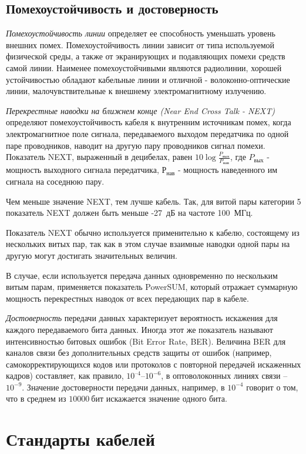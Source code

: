 \subsection{Помехоустойчивость и достоверность}

\emph{Помехоустойчивость линии} определяет ее способность уменьшать уровень внешних помех.
Помехоустойчивость линии зависит от типа используемой физической среды, а также от экранирующих и подавляющих помехи средств самой линии.
Наименее помехоустойчивыми являются радиолинии, хорошей устойчивостью обладают кабельные линии и отличной - волоконно-оптические линии, малочувствительные к внешнему электромагнитному излучению.

\emph{Перекрестные наводки на ближнем конце (Near End Cross Talk - NEXT)} определяют помехоустойчивость кабеля к внутренним источникам помех, когда электромагнитное поле сигнала, передаваемого выходом передатчика по одной паре проводников, наводит на другую пару проводников сигнал помехи.
Показатель NEXT, выраженный в децибелах, равен $10 \log \frac{P_\text{вых}}{P_\text{нав}}$, где $P_\text{вых}$ - мощность выходного сигнала передатчика, $Р_\text{нав}$ - мощность наведенного им сигнала на соседнюю пару.

Чем меньше значение NEXT, тем лучше кабель.
Так, для витой пары категории 5 показатель NEXT должен быть меньше -27~дБ на частоте 100~МГц.

Показатель NEXT обычно используется применительно к кабелю, состоящему из нескольких витых пар, так как в этом случае взаимные наводки одной пары на другую могут достигать значительных величин.

В случае, если используется передача данных одновременно по нескольким витым парам, применяется показатель PowerSUM, который отражает суммарную мощность перекрестных наводок от всех передающих пар в кабеле.

\emph{Достоверность} передачи данных характеризует вероятность искажения для каждого передаваемого бита данных.
Иногда этот же показатель называют интенсивностью битовых ошибок (Bit Error Rate, BER).
Величина BER для каналов связи без дополнительных средств защиты от ошибок (например, самокорректирующихся кодов или протоколов с повторной передачей искаженных кадров) составляет, как правило, $10^{–4} – 10^{-6}$, в оптоволоконных линиях связи – $10^{-9}$.
Значение достоверности передачи данных, например, в $10^{-4}$ говорит о том, что в среднем из $10 000~бит$ искажается значение одного бита.

\section{Стандарты кабелей}

